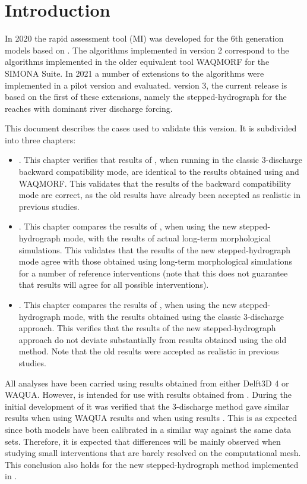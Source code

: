 \chapter{Introduction}
In 2020 the rapid assessment tool \dfastmi (MI) was developed for the 6th generation models based on \dflowfm.
The algorithms implemented in \dfmi version 2 correspond to the algorithms implemented in the older equivalent tool WAQMORF for the SIMONA Suite.
In 2021 a number of extensions to the \dfastmi algorithms were implemented in a pilot version and evaluated.
\dfmi version 3, the current release is based on the first of these extensions, namely the stepped-hydrograph for the reaches with dominant river discharge forcing.

This document describes the cases used to validate this version.
It is subdivided into three chapters:

\begin{itemize}
\item {}. This chapter verifies that results of , when running in the classic 3-discharge backward compatibility mode, are identical to the results obtained using  and WAQMORF.
This validates that the results of the backward compatibility mode are correct, as the old results have already been accepted as realistic in previous studies.
\item {}. This chapter compares the results of , when using the new stepped-hydrograph mode, with the results of actual long-term morphological simulations.
This validates that the results of the new stepped-hydrograph mode agree with those obtained using long-term morphological simulations for a number of reference interventions (note that this does not guarantee that results will agree for all possible interventions). 
\item {}. This chapter compares the results of , when using the new stepped-hydrograph mode, with the results obtained using the classic 3-discharge approach.
This verifies that the results of the new stepped-hydrograph approach do not deviate substantially from results obtained using the old method.
Note that the old results were accepted as realistic in previous studies.
\end{itemize}

All analyses have been carried using results obtained from either Delft3D 4 or WAQUA.
However,  is intended for use with results obtained from \dflowfm.
During the initial development of  it was verified that the 3-discharge method gave similar results when using WAQUA results and when using \dflowfm results \citep{DFAST2020}.
This is as expected since both models have been calibrated in a similar way against the same data sets.
Therefore, it is expected that differences will be mainly observed when studying small interventions that are barely resolved on the computational mesh.
This conclusion also holds for the new stepped-hydrograph method implemented in .